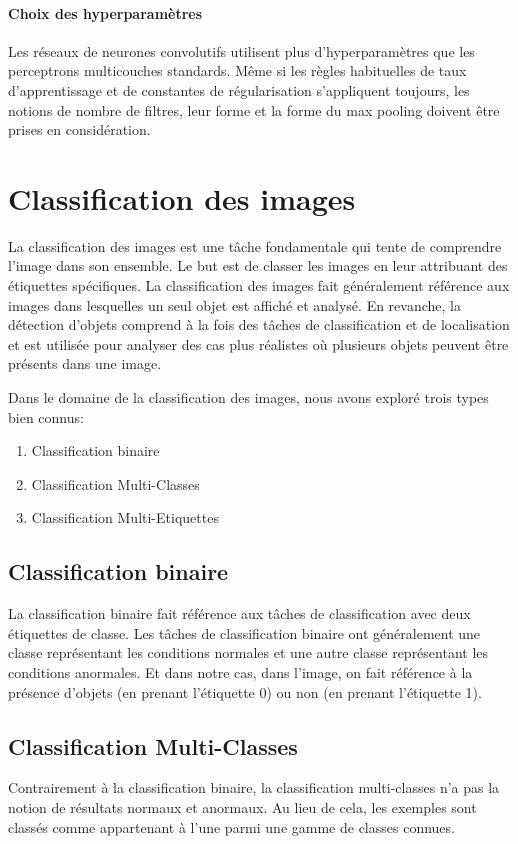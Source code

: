         \paragraph{Choix des hyperparamètres}
        Les réseaux de neurones convolutifs utilisent plus d'hyperparamètres que les perceptrons multicouches standards. Même si les règles habituelles de taux d'apprentissage et de constantes de régularisation s'appliquent toujours, les notions de nombre de filtres, leur forme et la forme du max pooling doivent être prises en considération.




\section{Classification des images}
    La classification des images est une tâche fondamentale qui tente de comprendre l'image dans son ensemble. Le but est de classer les images en leur attribuant des étiquettes spécifiques. La classification des images fait généralement référence aux images dans lesquelles un seul objet est affiché et  analysé. En revanche, la détection d'objets comprend à la fois des tâches de classification et de localisation et est utilisée pour analyser des cas plus réalistes où plusieurs objets peuvent être présents dans une image.

    Dans le domaine de la classification des images, nous avons exploré trois types bien connus:
    \begin{enumerate}
        \item Classification binaire
        \item Classification Multi-Classes
        \item Classification Multi-Etiquettes
    \end{enumerate}

    \subsection{Classification binaire}
        La classification binaire fait référence aux tâches de classification avec deux étiquettes de classe. 
        Les tâches de classification binaire ont généralement une classe représentant les conditions normales et une autre classe représentant les conditions anormales. 
        Et dans notre cas, dans l'image, on fait référence à la présence d'objets (en prenant l'étiquette 0) ou non (en prenant l'étiquette 1).
    \subsection{Classification Multi-Classes}
        Contrairement à la classification binaire, la classification multi-classes n'a pas la notion de résultats normaux et anormaux. Au lieu de cela, les exemples sont classés comme appartenant à l'une parmi une gamme de classes connues.

